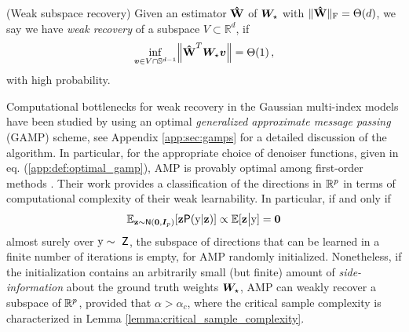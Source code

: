 \begin{definition}(Weak subspace recovery) Given an estimator $\boldsymbol{\mathbf{\hat{W}}}$ of $\bm{W}_{\star}$ with  $ \|\boldsymbol{\mathbf{\hat{W}}} \|_{\mathrm{F}}  = \mathrm{\Theta}(d)$, we say we have \emph{weak recovery} of a subspace $V \subset \mathbb{R}^d$,  if
\begin{equation}
    \label{eq:def_weak_recovery}
    \underset{\bm{v} \in V \cap \mathbb{S}^{d-1}}{\mathrm{inf}} \norm{\boldsymbol{\mathbf{\hat{W}}}^T \bm{W}_{\star} \bm{v}} = \mathrm{\Theta}(1) \, ,
\end{equation}
with high probability. 
\end{definition}
Computational bottlenecks for weak recovery in the Gaussian multi-index models have been studied by \cite{troiani2024fundamental} using an optimal \textit{generalized approximate message passing} (GAMP) scheme, see Appendix \ref{app:sec:gamps} for a detailed discussion of the algorithm. In particular, for the appropriate choice of denoiser functions, given in eq. (\ref{app:def:optimal_gamp}), AMP is provably optimal among first-order methods \cite{celentano2020estimation, montanari2024statistically}.
Their work provides a classification of the directions in $\mathbb{R}^p$ in terms of computational complexity of their weak learnability. In particular, if and only if 
\begin{equation}\label{eq:condition_non_triviality}
    \mathbb{E}_{\boldsymbol{\mathbf{z}}\sim\mathsf{N}({\boldsymbol 0},{\boldsymbol I}_p)}[\boldsymbol{\mathbf{z}}\mathsf{P}({ \mathrm{y} }|\boldsymbol{\mathbf{z}})] \propto \mathbb{E}[\boldsymbol{\mathbf{z}}\big|{ \mathrm{y} }]= {\boldsymbol 0}
\end{equation}
almost surely over ${ \mathrm{y} }\sim\ \mathsf{Z}$, the subspace of directions that can be learned in a finite number of iterations is empty, for AMP randomly initialized. Nonetheless, if the initialization contains an arbitrarily small (but finite) amount of \textit{side-information} about the ground truth weights ${\boldsymbol W}_\star$, AMP can weakly recover a subspace of $\mathbb{R}^p$, provided that $\alpha>\alpha_c$, where the critical sample complexity is characterized in Lemma \ref{lemma:critical_sample_complexity}.

